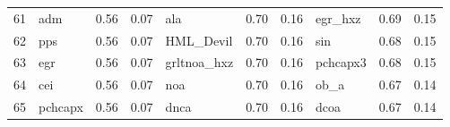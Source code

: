\documentclass[12pt]{article}
\begin{document}
\begin{landscape}
\begin{footnotesize}
\begin{longtable}{l|lcc|lcc|lcc}
			61                    & adm                         & 0.56                                                                                 & 0.07                            & ala                         & 0.70                                                                                 & 0.16                            & egr\_hxz                    & 0.69                                                                                 & 0.15                           \\
			62                    & pps                         & 0.56                                                                                 & 0.07                            & HML\_Devil                  & 0.70                                                                                 & 0.16                            & sin                         & 0.68                                                                                 & 0.15                           \\
			63                    & egr                         & 0.56                                                                                 & 0.07                            & grltnoa\_hxz                & 0.70                                                                                 & 0.16                            & pchcapx3                    & 0.68                                                                                 & 0.15                           \\
			64                    & cei                         & 0.56                                                                                 & 0.07                            & noa                         & 0.70                                                                                 & 0.16                            & ob\_a                       & 0.67                                                                                 & 0.14                           \\
			65                    & pchcapx                     & 0.56                                                                                 & 0.07                            & dnca                        & 0.70                                                                                 & 0.16                            & dcoa                        & 0.67                                                                                 & 0.14                           \\

\end{longtable}
\end{footnotesize}
\end{landscape}
\end{document}

